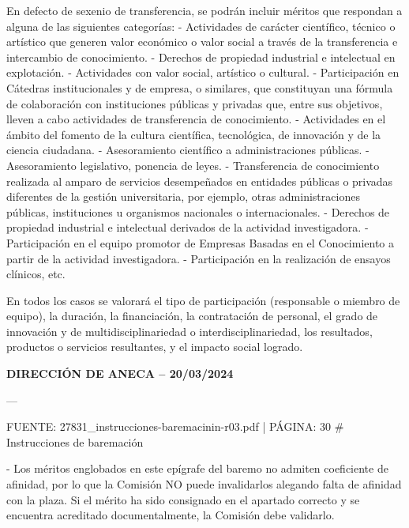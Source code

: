 \documentclass{article}
\begin{document}
\begin{itemize}
\begin{itemize}
\begin{scriptsize}
                  En defecto de sexenio de transferencia, se podrán incluir méritos que respondan a alguna de las siguientes categorías:
                  - Actividades de carácter científico, técnico o artístico que generen valor económico o valor social a través de la transferencia e intercambio de conocimiento.
                  - Derechos de propiedad industrial e intelectual en explotación.
                  - Actividades con valor social, artístico o cultural.
                  - Participación en Cátedras institucionales y de empresa, o similares, que constituyan una fórmula de colaboración con instituciones públicas y privadas que, entre sus objetivos, lleven a cabo actividades de transferencia de conocimiento.
                  - Actividades en el ámbito del fomento de la cultura científica, tecnológica, de innovación y de la ciencia ciudadana.
                  - Asesoramiento científico a administraciones públicas.
                  - Asesoramiento legislativo, ponencia de leyes.
                  - Transferencia de conocimiento realizada al amparo de servicios desempeñados en entidades públicas o privadas diferentes de la gestión universitaria, por ejemplo, otras administraciones públicas, instituciones u organismos nacionales o internacionales.
                  - Derechos de propiedad industrial e intelectual derivados de la actividad investigadora.
                  - Participación en el equipo promotor de Empresas Basadas en el Conocimiento a partir de la actividad investigadora.
                  - Participación en la realización de ensayos clínicos, etc.

                  En todos los casos se valorará el tipo de participación (responsable o miembro de equipo), la duración, la financiación, la contratación de personal, el grado de innovación y de multidisciplinariedad o interdisciplinariedad, los resultados, productos o servicios resultantes, y el impacto social logrado.

                  \textbf{DIRECCIÓN DE ANECA – 20/03/2024}

                  ---

                  FUENTE: 27831\_instrucciones-baremacinin-r03.pdf | PÁGINA: 30
                  \# Instrucciones de baremación

                  - Los méritos englobados en este epígrafe del baremo no admiten coeficiente de afinidad, por lo que la Comisión NO puede invalidarlos alegando falta de afinidad con la plaza. Si el mérito ha sido consignado en el apartado correcto y se encuentra acreditado documentalmente, la Comisión debe validarlo.


\end{scriptsize}
\end{itemize}
\end{itemize}
\end{document}
